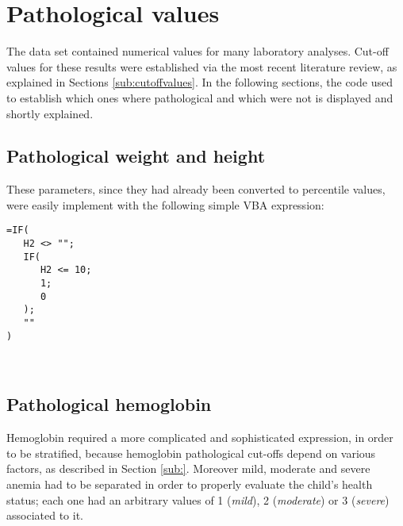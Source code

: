 \clearpage %

\section{Pathological values}\label{sec:pathologicalvalues}
The data set contained numerical values for many laboratory analyses. Cut-off values for these results were established via the most recent literature review, as explained in Sections \ref{sub:cutoffvalues}. In the following sections, the code used to establish which ones where pathological and which were not is displayed and shortly explained.

\subsection{Pathological weight and height}\label{sub:patweightandheight}
These parameters, since they had already been converted to percentile values, were easily implement with the following simple VBA expression:

\begin{minipage}{\linewidth}
\begin{lstlisting}
=IF(
   H2 <> "";
   IF(
      H2 <= 10;
      1;
      0
   );
   ""
)
\end{lstlisting}\
\end{minipage}

\subsection{Pathological hemoglobin}\label{sub:pathemoglobin}
Hemoglobin required a more complicated and sophisticated expression, in order to be stratified, because hemoglobin pathological cut-offs depend on various factors, as described in Section \ref{sub:}. Moreover mild, moderate and severe anemia had to be separated in order to properly evaluate the child's health status; each one had an arbitrary values of 1 (\textit{mild}), 2 (\textit{moderate}) or 3 (\textit{severe}) associated to it.

